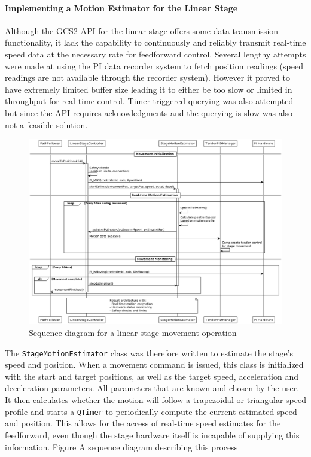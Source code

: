 \paragraph*{Implementing a Motion Estimator for the Linear Stage}
Although the GCS2 API for the linear stage offers some data transmission functionality, it lack the capability to continuously and reliably transmit real-time speed data at the necessary rate for feedforward control. Several lengthy attempts were made at using the PI data recorder system to fetch position readings (speed readings are not available through the recorder system). However it proved to have extremely limited buffer size leading it to either be too slow or limited in throughput for real-time control. Timer triggered querying was also attempted but since the API requires acknowledgments and the querying is slow was also not a feasible solution.

\begin{figure} [H]
    \centering
    \includegraphics[width=\linewidth]{images/linearstage/movetopos_sequencediag.png}
    \caption{Sequence diagram for a linear stage movement operation}
    \label{fig:movetopos}
\end{figure}

The \texttt{StageMotionEstimator} class was therefore written to estimate the stage's speed and position. When a movement command is issued, this class is initialized with the start and target positions, as well as the target speed, acceleration and deceleration parameters. All parameters that are known and chosen by the user. It then calculates whether the motion will follow a trapezoidal or triangular speed profile and starts a \texttt{QTimer} to periodically compute the current estimated speed and position. This allows for the access of real-time speed estimates for the feedforward, even though the stage hardware itself is incapable of supplying this information. Figure A sequence diagram describing this process


